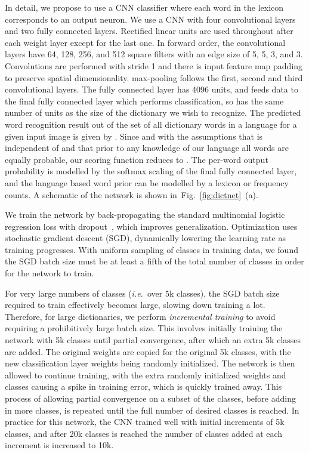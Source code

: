 \documentclass{article} \usepackage{nips14submit_e,times}
\newcommand{\figref}[1]{Fig.~\ref{#1}}
\def\ie{\emph{i.e.}}
\renewcommand{\paragraph}[1]{\par\noindent{\bf #1}}
\begin{document}
In detail, we propose to use a CNN classifier where each word  in the lexicon corresponds to an output neuron. We use a CNN with four convolutional layers and two fully connected layers. Rectified linear units are used throughout after each weight layer except for the last one. In forward order, the convolutional layers have 64, 128, 256, and 512 square filters with an edge size of 5, 5, 3, and 3. Convolutions are performed with stride 1 and there is input feature map padding to preserve spatial dimensionality.  max-pooling follows the first, second and third convolutional layers. The fully connected layer has 4096 units, and feeds data to the final fully connected layer which performs classification, so has the same number of units as the size of the dictionary we wish to recognize. The predicted word recognition result  out of the set of all dictionary words  in a language  for a given input image  is given by . Since  and with the assumptions that  is independent of  and that prior to any knowledge of our language all words are equally probable, our scoring function reduces to . The per-word output probability  is modelled by the softmax scaling of the final fully connected layer, and the language based word prior  can be modelled by a lexicon or frequency counts. A schematic of the network is shown in~\figref{fig:dictnet}~(a).

\paragraph{Training.}
We train the network by back-propagating the standard multinomial logistic regression loss with dropout~\cite{Hinton12}, which improves generalization. Optimization uses stochastic gradient descent (SGD), dynamically lowering the learning rate as training progresses. With uniform sampling of classes in training data, we found the SGD batch size must be at least a fifth of the total number of classes in order for the network to train. 

For very large numbers of classes (\ie~over 5k classes), the SGD batch size required to train effectively becomes large, slowing down training a lot. Therefore, for large dictionaries, we perform \emph{incremental training} to avoid requiring a prohibitively large batch size. This involves initially training the network with 5k classes until partial convergence, after which an extra 5k classes are added. The original weights are copied for the original 5k classes, with the new classification layer weights being randomly initialized. The network is then allowed to continue training, with the extra randomly initialized weights and classes causing a spike in training error, which is quickly trained away. This process of allowing partial convergence on a subset of the classes, before adding in more classes, is repeated until the full number of desired classes is reached. In practice for this network, the CNN trained well with initial increments of 5k classes, and after 20k classes is reached the number of classes added at each increment is increased to 10k.
\end{document}
